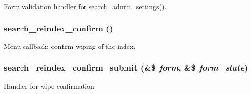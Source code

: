 \label{search_8admin_8inc_ac02dbfc93e16ceefc020a119da393584}
Form validation handler for \hyperlink{group__forms_gaa2b01af13156640d290f3a3c6042bd3a}{search\_\-admin\_\-settings()}. \hypertarget{search_8admin_8inc_ae9ae9613e345b5d8c1cec29acaa64045}{
\subsubsection[{search\_\-reindex\_\-confirm}]{\setlength{\rightskip}{0pt plus 5cm}search\_\-reindex\_\-confirm ()}}
\label{search_8admin_8inc_ae9ae9613e345b5d8c1cec29acaa64045}
Menu callback: confirm wiping of the index. \hypertarget{search_8admin_8inc_a608741a65307f9cedde7c77ce05f8a45}{
\subsubsection[{search\_\-reindex\_\-confirm\_\-submit}]{\setlength{\rightskip}{0pt plus 5cm}search\_\-reindex\_\-confirm\_\-submit (\&\$ {\em form}, \/  \&\$ {\em form\_\-state})}}
\label{search_8admin_8inc_a608741a65307f9cedde7c77ce05f8a45}
Handler for wipe confirmation 